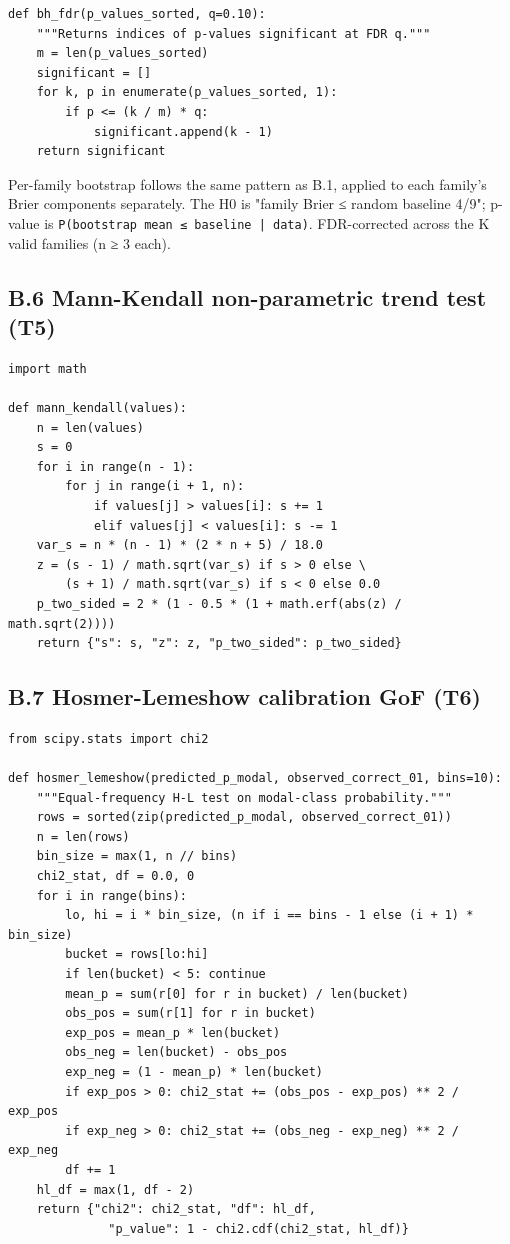 \documentclass[11pt,a4paper]{article}
\begin{document}
\begin{lstlisting}
def bh_fdr(p_values_sorted, q=0.10):
    """Returns indices of p-values significant at FDR q."""
    m = len(p_values_sorted)
    significant = []
    for k, p in enumerate(p_values_sorted, 1):
        if p <= (k / m) * q:
            significant.append(k - 1)
    return significant
\end{lstlisting}

Per-family bootstrap follows the same pattern as B.1, applied to each family's Brier components separately. The H0 is "family Brier ≤ random baseline 4/9"; p-value is \texttt{P(bootstrap mean ≤ baseline | data)}. FDR-corrected across the K valid families (n ≥ 3 each).

\subsection{B.6 Mann-Kendall non-parametric trend test (T5)}

\begin{lstlisting}
import math

def mann_kendall(values):
    n = len(values)
    s = 0
    for i in range(n - 1):
        for j in range(i + 1, n):
            if values[j] > values[i]: s += 1
            elif values[j] < values[i]: s -= 1
    var_s = n * (n - 1) * (2 * n + 5) / 18.0
    z = (s - 1) / math.sqrt(var_s) if s > 0 else \
        (s + 1) / math.sqrt(var_s) if s < 0 else 0.0
    p_two_sided = 2 * (1 - 0.5 * (1 + math.erf(abs(z) / math.sqrt(2))))
    return {"s": s, "z": z, "p_two_sided": p_two_sided}
\end{lstlisting}

\subsection{B.7 Hosmer-Lemeshow calibration GoF (T6)}

\begin{lstlisting}
from scipy.stats import chi2

def hosmer_lemeshow(predicted_p_modal, observed_correct_01, bins=10):
    """Equal-frequency H-L test on modal-class probability."""
    rows = sorted(zip(predicted_p_modal, observed_correct_01))
    n = len(rows)
    bin_size = max(1, n // bins)
    chi2_stat, df = 0.0, 0
    for i in range(bins):
        lo, hi = i * bin_size, (n if i == bins - 1 else (i + 1) * bin_size)
        bucket = rows[lo:hi]
        if len(bucket) < 5: continue
        mean_p = sum(r[0] for r in bucket) / len(bucket)
        obs_pos = sum(r[1] for r in bucket)
        exp_pos = mean_p * len(bucket)
        obs_neg = len(bucket) - obs_pos
        exp_neg = (1 - mean_p) * len(bucket)
        if exp_pos > 0: chi2_stat += (obs_pos - exp_pos) ** 2 / exp_pos
        if exp_neg > 0: chi2_stat += (obs_neg - exp_neg) ** 2 / exp_neg
        df += 1
    hl_df = max(1, df - 2)
    return {"chi2": chi2_stat, "df": hl_df,
              "p_value": 1 - chi2.cdf(chi2_stat, hl_df)}
\end{lstlisting}
\end{document}
